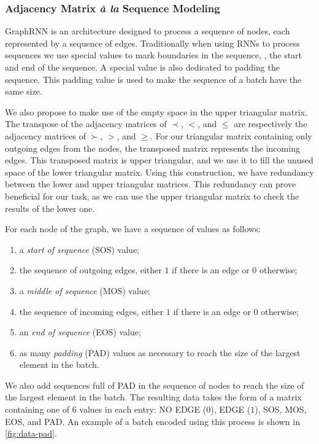 \subsubsection{Adjacency Matrix \emph{à la} Sequence Modeling}
GraphRNN is an architecture designed to process a sequence of nodes, each represented by a sequence of edges.
Traditionally when using RNNs to process sequences we use special values to mark boundaries in the sequence, \eg, the start and end of the sequence.
A special value is also dedicated to padding the sequence. This padding value is used to make the sequence of a batch have the same size.

We also propose to make use of the empty space in the upper triangular matrix.
The transpose of the adjacency matrices of $\prec$, $<$, and $\leq$ are respectively the adjacency matrices of $\succ$, $>$, and $\geq$.
For our triangular matrix containing only outgoing edges from the nodes, the transposed matrix represents the incoming edges.
This transposed matrix is upper triangular, and we use it to fill the unused space of the lower triangular matrix.
Using this construction, we have redundancy between the lower and upper triangular matrices.
This redundancy can prove beneficial for our task, as we can use the upper triangular matrix to check the results of the lower one.

For each node of the graph, we have a sequence of values as follows:
\begin{enumerate}
    \item a \textit{start of sequence} (SOS) value;
    \item the sequence of outgoing edges, either $1$ if there is an edge or $0$ otherwise;
    \item a \textit{middle of sequence} (MOS) value;
    \item the sequence of incoming edges, either $1$ if there is an edge or $0$ otherwise;
    \item an \textit{end of sequence} (EOS) value;
    \item as many \textit{padding} (PAD) values as necessary to reach the size of the largest element in the batch.
\end{enumerate}
We also add sequences full of PAD in the sequence of nodes to reach the size of the largest element in the batch.
The resulting data takes the form of a matrix containing one of 6 values in each entry: NO EDGE ($0$), EDGE ($1$), SOS, MOS, EOS, and PAD.
An example of a batch encoded using this process is shown in \cref{fig:data-pad}.

